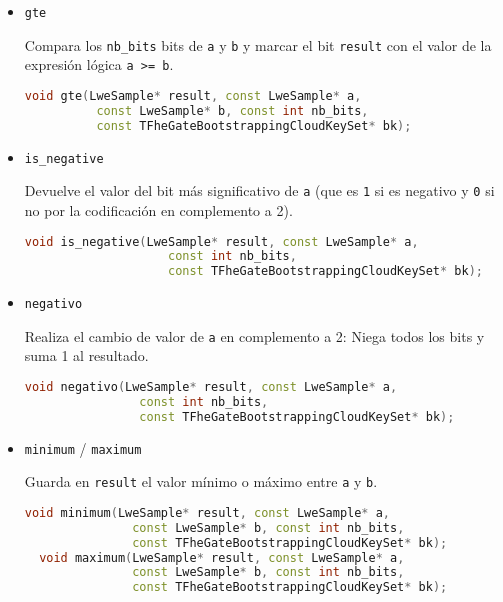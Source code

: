 \begin{itemize}
  \item \texttt{gte}

  Compara los \verb|nb_bits| bits de \verb|a| y \verb|b| y marcar el bit \verb|result| con el valor de la expresión lógica \verb|a >= b|.

  \begin{lstlisting}[language=c++]
  void gte(LweSample* result, const LweSample* a,
          const LweSample* b, const int nb_bits,
          const TFheGateBootstrappingCloudKeySet* bk);
  \end{lstlisting}

  \item \verb|is_negative|

  Devuelve el valor del bit más significativo de \verb|a| (que es \verb|1| si es negativo y \verb|0| si no por la codificación en complemento a 2).

  \begin{lstlisting}[language=c++]
  void is_negative(LweSample* result, const LweSample* a,
                    const int nb_bits,
                    const TFheGateBootstrappingCloudKeySet* bk);
  \end{lstlisting}

  \item \texttt{negativo}

  Realiza el cambio de valor de \verb|a| en complemento a 2: Niega todos los bits y suma 1 al resultado.

  \begin{lstlisting}[language=c++]
  void negativo(LweSample* result, const LweSample* a,
                const int nb_bits,
                const TFheGateBootstrappingCloudKeySet* bk);
  \end{lstlisting}


  \item \texttt{minimum} / \texttt{maximum}

  Guarda en \verb|result| el valor mínimo o máximo entre \verb|a| y \verb|b|.

  \begin{lstlisting}[language=c++]
  void minimum(LweSample* result, const LweSample* a,
               const LweSample* b, const int nb_bits,
               const TFheGateBootstrappingCloudKeySet* bk);
  void maximum(LweSample* result, const LweSample* a,
               const LweSample* b, const int nb_bits,
               const TFheGateBootstrappingCloudKeySet* bk);
  \end{lstlisting}


\end{itemize}
